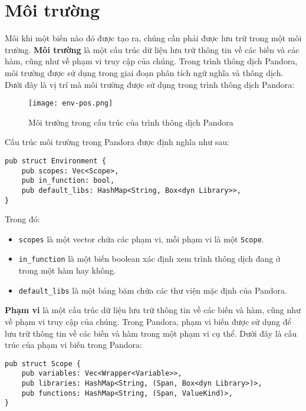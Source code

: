 \section{Môi trường}
\label{ch6:env}

    Môi khi một biến nào đó được tạo ra, chúng cần phải được lưu trữ trong một môi trường. \textbf{Môi trường} là một cấu trúc dữ liệu lưu trữ thông tin về các biến và các hàm, cũng như về phạm vi truy cập của chúng. Trong trình thông dịch Pandora, môi trường được sử dụng trong giai đoạn phân tích ngữ nghĩa và thông dịch. Dưới đây là vị trí mà  môi trường được sử dụng trong trình thông dịch Pandora:

\begin{figure}[H]
    \centering
    \texttt{[image: env-pos.png]}
    \caption{Môi trường trong cấu trúc của trình thông dịch Pandora}
\end{figure}

\noindent Cấu trúc môi trường trong Pandora được định nghĩa như sau:

\begin{lstlisting}[]
pub struct Environment {
    pub scopes: Vec<Scope>,
    pub in_function: bool,
    pub default_libs: HashMap<String, Box<dyn Library>>,
}
\end{lstlisting}

    Trong đó:
    \begin{itemize}
        \item \texttt{scopes} là một vector chứa các phạm vi, mỗi phạm vi là một \texttt{Scope}.
        \item \texttt{in\_function} là một biến boolean xác định xem trình thông dịch đang ở trong một hàm hay không.
        \item \texttt{default\_libs} là một bảng băm chứa các thư viện mặc định của Pandora.
    \end{itemize}

    \textbf{Phạm vi} là một cấu trúc dữ liệu lưu trữ thông tin về các biến và hàm, cũng như về phạm vi truy cập của chúng. Trong Pandora, phạm vi biến được sử dụng để lưu trữ thông tin về các biến và hàm trong một phạm vi cụ thể. Dưới đây là cấu trúc của phạm vi biến trong Pandora:

\begin{lstlisting}[]
pub struct Scope {
    pub variables: Vec<Wrapper<Variable>>,
    pub libraries: HashMap<String, (Span, Box<dyn Library>)>,
    pub functions: HashMap<String, (Span, ValueKind)>,      
}
\end{lstlisting}


